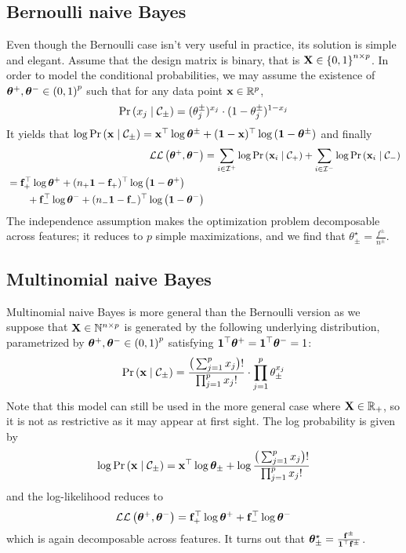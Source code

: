 \subsection{Bernoulli naive Bayes}\label{subsec:bnb}

Even though the Bernoulli case isn't very useful in practice, its solution is simple and elegant.
Assume that the design matrix is binary, that is $\mathbf{X} \in \left\{ 0, 1 \right\}^{n \times p}$.
In order to model the conditional probabilities, we may assume the existence of $\bm{\theta}^+, \bm{\theta}^- \in \left( 0, 1 \right)^p$
such that for any data point $\mathbf{x} \in \mathbb{R}^p$,
\[
        \Pr\left( x_j \mid \mathcal{C}_\pm \right) = (\theta^\pm_j)^{x_j} \cdot (1 - \theta^\pm_j)^{1 - x_j}
\]
It yields that $\log \Pr\left( \mathbf{x} \mid \mathcal{C}_\pm \right) =
\mathbf{x}^\top\log\bm{\theta}^\pm + (\mathbf{1} - \mathbf{x})^\top\log\left( \mathbf{1} - \bm{\theta}^\pm \right)$
and finally
\begin{align*}
        \mathcal{L}\mathcal{L}\left( \bm{\theta}^+, \bm{\theta}^- \right)
        &= \sum_{i \in \mathcal{I}^+} \log \Pr\left( \mathbf{x}_i \mid \mathcal{C}_+ \right)
                + \sum_{i \in \mathcal{I}^-} \log \Pr\left( \mathbf{x}_i \mid \mathcal{C}_- \right)\\
        \begin{split}
                &= \mathbf{f}_+^\top\log\bm{\theta}^+ + (n_+\mathbf{1} - \mathbf{f}_+)^\top\log\left( \mathbf{1} - \bm{\theta}^+ \right)\\
                &\qquad+ \mathbf{f}_-^\top\log\bm{\theta}^- + (n_-\mathbf{1} - \mathbf{f}_-)^\top\log\left( \mathbf{1} - \bm{\theta}^- \right)
        \end{split}
\end{align*}
The independence assumption makes the optimization problem decomposable across features;
it reduces to $p$ simple maximizations, and we find that $\theta_\pm^\star = \frac{f^\pm}{n^\pm}$.

\subsection{Multinomial naive Bayes}\label{subsec:mnb}

Multinomial naive Bayes is more general than the Bernoulli version
as we suppose that $\mathbf{X} \in \mathbb{N}^{n \times p}$ is generated by the following underlying distribution,
parametrized by $\bm{\theta}^+, \bm{\theta}^- \in \left( 0, 1 \right)^p$ satisfying
$\mathbf{1}^\top\bm{\theta}^+ = \mathbf{1}^\top\bm{\theta}^- = 1$:
\[
        \Pr\left( \mathbf{x} \mid \mathcal{C}_\pm \right) =
                \frac{\big( \sum_{j = 1}^p x_j \big)!}
                        {\prod_{j = 1}^p x_j!} \cdot \prod_{j = 1}^p \theta_\pm^{x_j}
\]
Note that this model can still be used in the more general case where $\mathbf{X} \in \mathbb{R}_+$, so it is not as restrictive as
it may appear at first sight.
The log probability is given by
\[
        \log\Pr\left(\mathbf{x} \mid \mathcal{C}_\pm\right) =
                \mathbf{x}^\top\log\bm{\theta}_\pm + \log\frac{\big(\sum_{j = 1}^p x_j\big)!}{\prod_{j = 1}^p x_j!}
\]
and the log-likelihood reduces to
\[
        \mathcal{L}\mathcal{L}\left(\bm{\theta}^+, \bm{\theta}^-\right) = \mathbf{f}_+^\top\log\bm{\theta}^+ + \mathbf{f}_-^\top\log\bm{\theta}^-
\]
which is again decomposable across features.
It turns out that $\bm{\theta}_\pm^\star = \frac{\mathbf{f}^\pm}{\mathbf{1}^\top\mathbf{f}^\pm}$.

